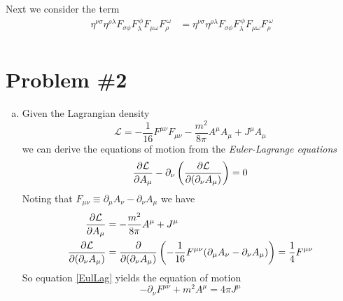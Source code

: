 \documentclass[11pt]{article}
\numberwithin{equation}{section}
\begin{document}
\begin{enumerate}[(a)]
    Next we consider the term 
    \begin{align*}
        \eta^{\nu\sigma}\eta^{\rho\lambda}F_{\sigma\phi}F_{\lambda}^{\ \phi}F_{\mu\omega}F^{\ \omega}_{\rho} &= \eta^{\nu\sigma}\eta^{\rho\lambda}F_{\sigma\phi}F_{\lambda}^{\ \phi}F_{\mu\omega}F^{\ \omega}_{\rho}\\
    \end{align*}






\end{enumerate}

\pagebreak

\section{Problem \#2}
\begin{enumerate}[(a)]
\item
    Given the Lagrangian density
    \begin{equation}
        \mathcal{L} = -\frac{1}{16}F^{\mu\nu}F_{\mu\nu} - \frac{m^2}{8\pi}A^{\mu}A_{\mu}+J^{\mu}A_{\mu}
        \label{LagDen}
    \end{equation}
    we can derive the equations of motion from the \emph{Euler-Lagrange equations}
    \begin{equation}
        \frac{\partial{\mathcal{L}}}{\partial{A_{\mu}}} - \partial_{\nu}\left(\frac{\partial{\mathcal{L}}}{\partial{(\partial_{\nu}A_{\mu})}}\right) = 0
        \label{EulLag}
    \end{equation}
    Noting that $F_{\mu\nu}\equiv\partial_{\mu}A_{\nu}-\partial_{\nu}A_{\mu}$ we have
    \begin{align*}
        \frac{\partial{\mathcal{L}}}{\partial{A_{\mu}}} &= -\frac{m^2}{8\pi}A^{\mu} + J^{\mu}\\
        \frac{\partial{\mathcal{L}}}{\partial{(\partial_{\nu}A_{\mu})}} &= \frac{\partial{}}{\partial{(\partial_{\nu}A_{\mu})}}\left(-\frac{1}{16}F^{\mu\nu}(\partial_{\mu}A_{\nu}-\partial_{\nu}A_{\mu})\right) = \frac{1}{4}F^{\mu\nu}
    \end{align*}
    So equation \ref{EulLag} yields the equation of motion
    $$-\partial_{\nu}F^{\mu\nu} + m^2A^{\mu} = 4\pi{J^{\mu}}$$


\end{enumerate}
\end{document}
